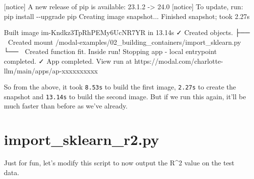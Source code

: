 \documentclass[
  letterpaper,
  DIV=11,
  numbers=noendperiod]{scrreprt}
\newenvironment{Shaded}{\begin{snugshade}}{\end{snugshade}}
\newcommand{\AttributeTok}[1]{\textcolor[rgb]{0.40,0.45,0.13}{#1}}
\newcommand{\ExtensionTok}[1]{\textcolor[rgb]{0.00,0.23,0.31}{#1}}
\newcommand{\KeywordTok}[1]{\textcolor[rgb]{0.00,0.23,0.31}{#1}}
\newcommand{\NormalTok}[1]{\textcolor[rgb]{0.00,0.23,0.31}{#1}}
\newcommand{\OperatorTok}[1]{\textcolor[rgb]{0.37,0.37,0.37}{#1}}
\begin{document}
\begin{Shaded}
\begin{Highlighting}[]
\ExtensionTok{[notice]}\NormalTok{ A new release of pip is available: 23.1.2 }\AttributeTok{{-}}\OperatorTok{\textgreater{}}\NormalTok{ 24.0}
\ExtensionTok{[notice]}\NormalTok{ To update, run: pip install }\AttributeTok{{-}{-}upgrade}\NormalTok{ pip}
\ExtensionTok{Creating}\NormalTok{ image snapshot...}
\ExtensionTok{Finished}\NormalTok{ snapshot}\KeywordTok{;} \ExtensionTok{took}\NormalTok{ 2.27s}

\ExtensionTok{Built}\NormalTok{ image im{-}Kndkz3TpRhPEMy6UcNR7YR in 13.14s}
\ExtensionTok{✓}\NormalTok{ Created objects.}
\ExtensionTok{├──}\NormalTok{ 🔨 Created mount /modal{-}examples/02\_building\_containers/import\_sklearn.py}
\ExtensionTok{└──}\NormalTok{ 🔨 Created function fit.}
\ExtensionTok{Inside}\NormalTok{ run!}
\ExtensionTok{Stopping}\NormalTok{ app }\AttributeTok{{-}}\NormalTok{ local entrypoint completed.}
\ExtensionTok{✓}\NormalTok{ App completed. View run at https://modal.com/charlotte{-}llm/main/apps/ap{-}xxxxxxxxxx}
\end{Highlighting}
\end{Shaded}

So from the above, it took \texttt{8.53s} to build the first image,
\texttt{2.27s} to create the snapshot and \texttt{13.14s} to build the
second image. But if we run this again, it'll be much faster than before
as we've already.

\hypertarget{import_sklearn_r2.py}{%
\section{import\_sklearn\_r2.py}\label{import_sklearn_r2.py}}

Just for fun, let's modify this script to now output the R\^{}2 value on
the test data.
\end{document}
